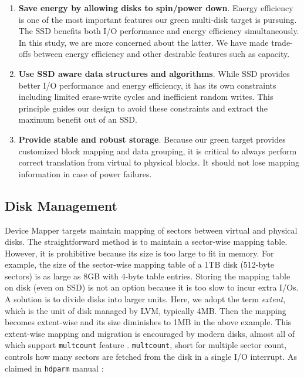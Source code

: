 \begin{enumerate}

\item \textbf{Save energy by allowing disks to spin/power down}.
Energy efficiency is one of the most important features our green
multi-disk target is pursuing. The SSD benefits both I/O performance
and energy efficiency simultaneously. In this study, we are more
concerned about the latter. We have made trade-offs between energy
efficiency and other desirable features such as capacity.

\item \textbf{Use SSD aware data structures and algorithms}. While SSD
provides better I/O performance and energy efficiency, it has its own
constraints including limited erase-write cycles and inefficient
random writes. This principle guides our design to avoid these
constraints and extract the maximum benefit out of an SSD.

\item \textbf{Provide stable and robust storage}. Because our green
target provides customized block mapping and data grouping, it is
critical to always perform correct translation from virtual to
physical blocks. It should not lose mapping information in case of
power failures.

\end{enumerate}

\subsection{Disk Management}

Device Mapper targets maintain mapping of sectors between virtual and
physical disks. The straightforward method is to maintain a
sector-wise mapping table. However, it is prohibitive because its size
is too large to fit in memory. For example, the size of the
sector-wise mapping table of a 1TB disk (512-byte sectors) is as large
as 8GB with 4-byte table entries. Storing the mapping table on disk
(even on SSD) is not an option because it is too slow to incur extra
I/Os. A solution is to divide disks into larger units. Here, we adopt
the term \textit{extent}, which is the unit of disk managed by LVM,
typically 4MB. Then the mapping becomes extent-wise and its size
diminishes to 1MB in the above example. This extent-wise mapping and
migration is encouraged by modern disks, almost all of which support
\texttt{multcount} feature \cite{speed_up}. \texttt{multcount}, short
for multiple sector count, controls how many sectors are fetched from
the disk in a single I/O interrupt. As claimed in \texttt{hdparm}
manual \cite{hdparm}: 

